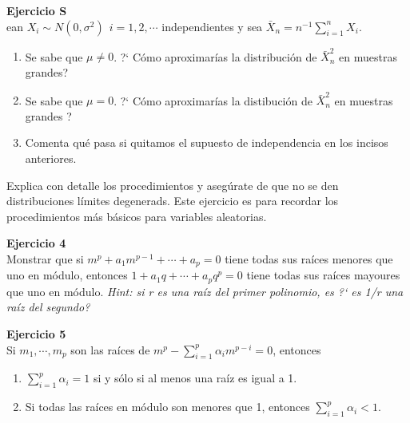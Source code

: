\documentclass[a4paper, 11pt]{article}
\newenvironment{problem}[2][Ejercicio]
{ \begin{mdframed}[backgroundcolor= red!50] \textbf{#1 #2} \\}
	{  \end{mdframed}}
\begin{document}
\begin{problem}
    Sean $X_i \sim N(0, \sigma^2) \: \: i = 1,2,\cdots$ independientes y sea $\bar{X}_n = n^{-1} \sum _{i=1}^n X_i .$
    \begin{enumerate}
        \item Se sabe que $\mu \neq 0$. ?` Cómo aproximarías la distribución de $\bar{X}_n^2 $ en muestras grandes? 
        \item Se sabe que $\mu = 0$. ?` Cómo aproximarías la distibución de $\bar{X}_n^2$ en muestras grandes ?
        \item Comenta qué pasa si quitamos el supuesto de independencia en los incisos anteriores. 
    \end{enumerate} 
    Explica con detalle los procedimientos y asegúrate de que no se den distribuciones límites degenerads. Este ejercicio es para recordar los procedimientos más básicos para variables aleatorias.
\end{problem}

\begin{problem}{4}
    Monstrar que si $m^p + a_1 m^{p-1} + \cdots + a_p = 0 $ tiene todas sus raíces menores que uno en módulo, entonces $1+ a_1 q + \cdots + a_p q^p = 0$ tiene todas sus raíces mayoures que uno en módulo. \textit{Hint: si r es una raíz del primer polinomio, es ?` es 1/r una raíz del segundo?}    
\end{problem}

\begin{problem}{5}
    Si $m_1, \cdots, m_p$ son las raíces de $ m^p - \sum _{i=1}^p \alpha_i m^{p-i} =  0$, entonces
    \begin{enumerate}
        \item $\sum _{i=1}^p \alpha_i = 1$ si y sólo si al menos una raíz es igual a 1.
        \item Si todas las raíces en módulo son menores que 1, entonces $\sum_{i=1}^p \alpha_i <1$.
    \end{enumerate}
\end{problem}
\end{document}

